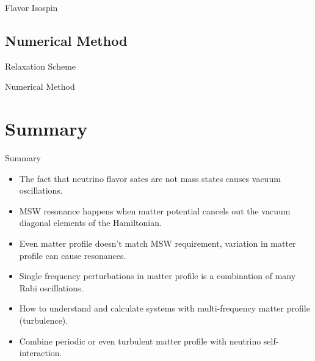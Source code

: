 \documentclass[9pt]{beamer}
\begin{document}
\begin{darkframes}
\begin{frame}{Flavor Isospin}

\end{frame}


\subsection{Numerical Method}

\begin{frame}{Relaxation Scheme}


    
\end{frame}


\begin{frame}{Numerical Method}


    
\end{frame}






\section{Summary}

\begin{frame}{Summary}



\begin{itemize}\color{ao}
\item
The fact that neutrino flavor sates are not mass states causes vacuum oscillations.
\item
MSW resonance happens when matter potential cancels out the vacuum diagonal elements of the Hamiltonian.
\item
Even matter profile doesn't match MSW requirement, variation in matter profile can cause resonances.
\item
Single frequency perturbations in matter profile is a combination of many Rabi oscillations.
\end{itemize}



\begin{itemize}\color{red}
 \item
 How to understand and calculate systems with multi-frequency matter profile (turbulence).
 \item
 Combine periodic or even turbulent matter profile with neutrino self-interaction.
\end{itemize}





\end{frame}
\end{darkframes}
\end{document}
